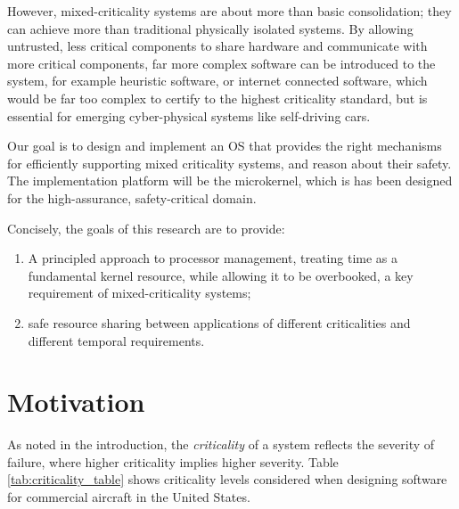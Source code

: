 However, mixed-criticality systems are about more than basic consolidation; they can achieve more
than traditional physically isolated systems. By allowing untrusted, less critical components to
share hardware and communicate with more critical components, far more complex software can be
introduced to the system, for example heuristic software, or internet connected software, 
which would be far too complex to certify to the highest criticality standard,
but is essential for emerging cyber-physical systems like self-driving cars.

Our goal is to design and implement an OS that provides the right mechanisms for efficiently
supporting mixed criticality systems, and reason about their safety.
The implementation platform will be the \selfour
microkernel, which is has been designed for the high-assurance, safety-critical domain.

Concisely, the goals of this research are to provide:
\begin{enumerate}[label=\textbf{G\arabic*}] 
    \item\label{G1} A principled approach to
    processor management, treating time as a fundamental kernel resource, while
    allowing it to be overbooked, a key requirement of mixed-criticality systems;
    \item safe resource sharing between applications of different criticalities and
    different temporal requirements.  
\end{enumerate}


\section{Motivation}

As noted in the introduction, the \emph{criticality} of a system reflects the
severity of failure, where higher criticality implies higher severity.  Table
\ref{tab:criticality_table} shows criticality levels considered when designing
software for commercial aircraft in the United States.


